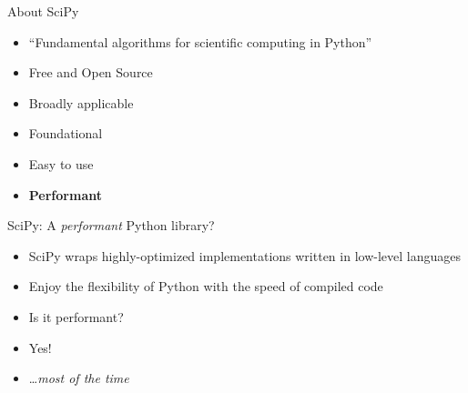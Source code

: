 \documentclass[12pt,xcolor=dvipsnames]{beamer}
\begin{document}
    \begin{frame}{About SciPy}
        \begin{itemize}
            \item ``Fundamental algorithms for scientific computing in Python''
            \item Free and Open Source
            \item Broadly applicable
            \item Foundational
            \item Easy to use
            \item \textbf{Performant}
        \end{itemize}
    \end{frame}

    \begin{frame}{SciPy: A \textit{performant} Python library?}
        \begin{itemize}
            \item<1-> SciPy wraps highly-optimized implementations written in low-level languages
            \item<1-> Enjoy the flexibility of Python with the speed of compiled code
            \item<1-> Is it performant?
            \item<2-> Yes!
            \item<3-> \ldots \textit{most of the time}
        \end{itemize}
    \end{frame}
\end{document}
